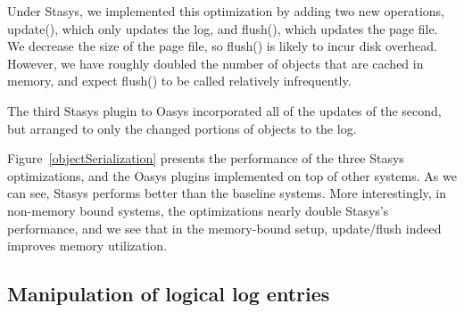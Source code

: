 \documentclass[letterpaper,twocolumn,10pt]{article}
\newcommand{\yad}{Stasys\xspace}
\newcommand{\oasys}{Oasys\xspace}
\begin{document}
Under \yad, we implemented this optimization by adding two new
operations, update(), which only updates the log, and flush(), which
updates the page file.  We decrease the size of the page file, so
flush() is likely to incur disk overhead.  However, we have roughly
doubled the number of objects that are cached in memory, and expect
flush() to be called relatively infrequently.

The third \yad plugin to \oasys incorporated all of the updates of the
second, but arranged to only the changed portions of objects to the
log.

Figure~\ref{objectSerialization} presents the performance of the three
\yad optimizations, and the \oasys plugins implemented on top of other
systems.  As we can see, \yad performs better than the baseline
systems.  More interestingly, in non-memory bound systems, the
optimizations nearly double \yad's performance, and we see that in the
memory-bound setup, update/flush indeed improves memory utilization.


\subsection{Manipulation of logical log entries}
\end{document}
